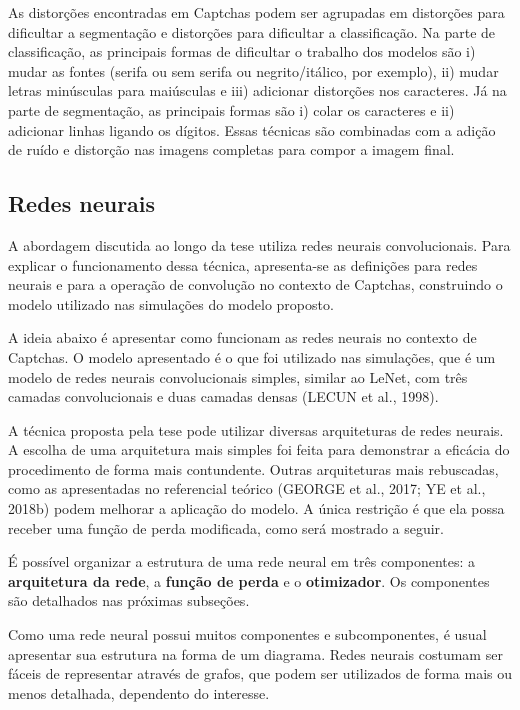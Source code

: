 \documentclass[12pt,twoside,brazilian]{book}
\begin{document}
As distorções encontradas em Captchas podem ser agrupadas em distorções
para dificultar a segmentação e distorções para dificultar a
classificação. Na parte de classificação, as principais formas de
dificultar o trabalho dos modelos são i) mudar as fontes (serifa ou sem
serifa ou negrito/itálico, por exemplo), ii) mudar letras minúsculas
para maiúsculas e iii) adicionar distorções nos caracteres. Já na parte
de segmentação, as principais formas são i) colar os caracteres e ii)
adicionar linhas ligando os dígitos. Essas técnicas são combinadas com a
adição de ruído e distorção nas imagens completas para compor a imagem
final.

\hypertarget{redes-neurais}{%
\subsection{Redes neurais}\label{redes-neurais}}

A abordagem discutida ao longo da tese utiliza redes neurais
convolucionais. Para explicar o funcionamento dessa técnica,
apresenta-se as definições para redes neurais e para a operação de
convolução no contexto de Captchas, construindo o modelo utilizado nas
simulações do modelo proposto.

A ideia abaixo é apresentar como funcionam as redes neurais no contexto
de Captchas. O modelo apresentado é o que foi utilizado nas simulações,
que é um modelo de redes neurais convolucionais simples, similar ao
LeNet, com três camadas convolucionais e duas camadas densas (LECUN et
al., 1998).

A técnica proposta pela tese pode utilizar diversas arquiteturas de
redes neurais. A escolha de uma arquitetura mais simples foi feita para
demonstrar a eficácia do procedimento de forma mais contundente. Outras
arquiteturas mais rebuscadas, como as apresentadas no referencial
teórico (GEORGE et al., 2017; YE et al., 2018b) podem melhorar a
aplicação do modelo. A única restrição é que ela possa receber uma
função de perda modificada, como será mostrado a seguir.

É possível organizar a estrutura de uma rede neural em três componentes:
a \textbf{arquitetura da rede}, a \textbf{função de perda} e o
\textbf{otimizador}. Os componentes são detalhados nas próximas
subseções.

Como uma rede neural possui muitos componentes e subcomponentes, é usual
apresentar sua estrutura na forma de um diagrama. Redes neurais costumam
ser fáceis de representar através de grafos, que podem ser utilizados de
forma mais ou menos detalhada, dependento do interesse.
\end{document}

